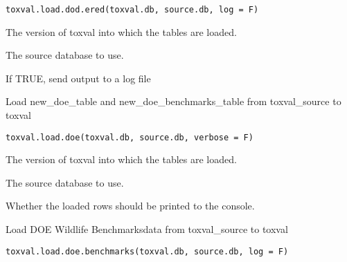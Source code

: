 \documentclass[letterpaper]{book}
\begin{document}
%
\begin{Usage}
\begin{verbatim}
toxval.load.dod.ered(toxval.db, source.db, log = F)
\end{verbatim}
\end{Usage}
%
\begin{Arguments}
\begin{ldescription}
\item[\code{toxval.db}] The version of toxval into which the tables are loaded.

\item[\code{source.db}] The source database to use.

\item[\code{log}] If TRUE, send output to a log file
\end{ldescription}
\end{Arguments}
%
\begin{Description}\relax
Load new\_doe\_table and new\_doe\_benchmarks\_table from toxval\_source to toxval
\end{Description}
%
\begin{Usage}
\begin{verbatim}
toxval.load.doe(toxval.db, source.db, verbose = F)
\end{verbatim}
\end{Usage}
%
\begin{Arguments}
\begin{ldescription}
\item[\code{toxval.db}] The version of toxval into which the tables are loaded.

\item[\code{source.db}] The source database to use.

\item[\code{verbose}] Whether the loaded rows should be printed to the console.
\end{ldescription}
\end{Arguments}
%
\begin{Description}\relax
Load DOE Wildlife Benchmarksdata from toxval\_source to toxval
\end{Description}
%
\begin{Usage}
\begin{verbatim}
toxval.load.doe.benchmarks(toxval.db, source.db, log = F)
\end{verbatim}
\end{Usage}
\end{document}
